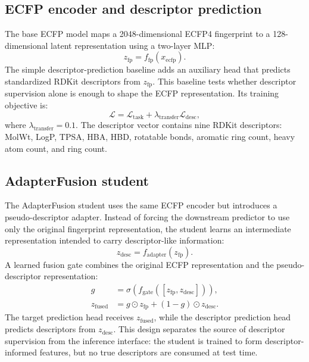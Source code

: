 \documentclass[11pt]{article}
\begin{document}
\subsection{ECFP encoder and descriptor prediction}

The base ECFP model maps a 2048-dimensional ECFP4 fingerprint to a
128-dimensional latent representation using a two-layer MLP:
\begin{equation}
z_{\mathrm{fp}} = f_{\mathrm{fp}}(x_{\mathrm{ecfp}}).
\label{eq:ecfp_encoder}
\end{equation}
The simple descriptor-prediction baseline adds an auxiliary head that predicts
standardized RDKit descriptors from $z_{\mathrm{fp}}$. This baseline tests
whether descriptor supervision alone is enough to shape the ECFP
representation. Its training objective is:
\begin{equation}
\mathcal{L} =
\mathcal{L}_{\mathrm{task}} +
\lambda_{\mathrm{transfer}}\mathcal{L}_{\mathrm{desc}},
\label{eq:descpred_loss}
\end{equation}
where $\lambda_{\mathrm{transfer}}=0.1$. The descriptor vector contains nine
RDKit descriptors: MolWt, LogP, TPSA, HBA, HBD, rotatable bonds, aromatic ring
count, heavy atom count, and ring count.

\subsection{AdapterFusion student}

The AdapterFusion student uses the same ECFP encoder but introduces a
pseudo-descriptor adapter. Instead of forcing the downstream predictor to use
only the original fingerprint representation, the student learns an
intermediate representation intended to carry descriptor-like information:
\begin{equation}
z_{\mathrm{desc}} = f_{\mathrm{adapter}}(z_{\mathrm{fp}}).
\label{eq:adapter}
\end{equation}
A learned fusion gate combines the original ECFP representation and the
pseudo-descriptor representation:
\begin{align}
g &= \sigma(f_{\mathrm{gate}}([z_{\mathrm{fp}}, z_{\mathrm{desc}}])),\\
z_{\mathrm{fused}} &= g \odot z_{\mathrm{fp}} + (1-g)\odot z_{\mathrm{desc}}.
\label{eq:fusion}
\end{align}
The target prediction head receives $z_{\mathrm{fused}}$, while the descriptor
prediction head predicts descriptors from $z_{\mathrm{desc}}$. This design
separates the source of descriptor supervision from the inference interface:
the student is trained to form descriptor-informed features, but no true
descriptors are consumed at test time.
\end{document}

